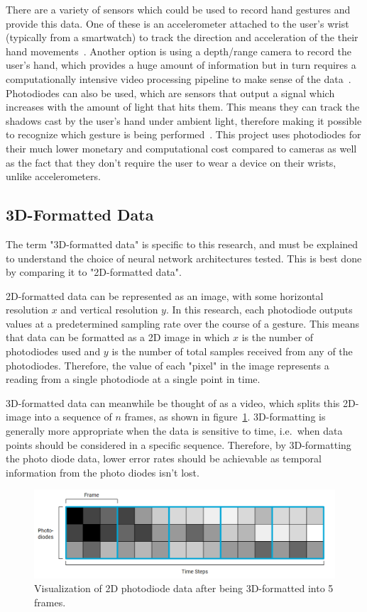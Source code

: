 There are a variety of sensors which could be used to record hand gestures and provide this data.
One of these is an accelerometer attached to the user's wrist (typically from a smartwatch) to track the direction and acceleration of the their hand movements~\cite{4912759}.
Another option is using a depth/range camera to record the user's hand, which provides a huge amount of information but in turn requires a computationally intensive video processing pipeline to make sense of the data~\cite{article}.
Photodiodes can also be used, which are sensors that output a signal which increases with the amount of light that hits them.
This means they can track the shadows cast by the user's hand under ambient light, therefore making it possible to recognize which gesture is being performed~\cite{8947919}.
This project uses photodiodes for their much lower monetary and computational cost compared to cameras as well as the fact that they don't require the user to wear a device on their wrists, unlike accelerometers.

\subsection{3D-Formatted Data}\label{subsec:3d-formatted-data}
The term "3D-formatted data" is specific to this research, and must be explained to understand the choice of neural network architectures tested.
This is best done by comparing it to "2D-formatted data".

2D-formatted data can be represented as an image, with some horizontal resolution $x$ and vertical resolution $y$.
In this research, each photodiode outputs values at a predetermined sampling rate over the course of a gesture.
This means that data can be formatted as a 2D image in which $x$ is the number of photodiodes used and $y$ is the number of total samples received from any of the photodiodes.
Therefore, the value of each "pixel" in the image represents a reading from a single photodiode at a single point in time.

3D-formatted data can meanwhile be thought of as a video, which splits this 2D-image into a sequence of $n$ frames, as shown in figure~\ref{fig:3d-data}\@.
3D-formatting is generally more appropriate when the data is sensitive to time, i.e.\ when data points should be considered in a specific sequence.
Therefore, by 3D-formatting the photo diode data, lower error rates should be achievable as temporal information from the photo diodes isn't lost.

\begin{figure}[h]
    \centering
    \captionsetup{justification=centering}
    \includegraphics[width=\linewidth]{figures/3d_data}
    \caption{Visualization of 2D photodiode data after being 3D-formatted into 5 frames.}
    \label{fig:3d-data}
\end{figure}